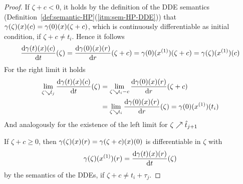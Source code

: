 \begin{proof}
        If $\zeta+c<0$, it holds by the definition of the DDE semantics (Definition~\ref{def:semantic-HP}(\ref{itm:sem-HP-DDE})) that $\gamma(\zeta)(x)(c)=\gamma(0)(x)(\zeta+c)$, which is continuously differentiable as initial condition, if $\zeta+c\neq t_i$. Hence it follows
        \begin{equation*}
            \DD{\trajectory(t)(x)(c)}{t}(\zeta)=\DD{\trajectory(0)(x)(\past)}{\past}(\zeta+c)=\trajectory(0)(\D{x})(\zeta+c)=\trajectory(\zeta)(\D{x})(c)
        \end{equation*}
        For the right limit it holds
        \begin{align*}
            \lim_{\zeta\downto\hat{t}_j} \DD{\trajectory(t)(x)(c)}{t}(\zeta)
                & = \lim_{\zeta\downto t_i-c} \DD{\trajectory(0)(x)(\past)}{\past}(\zeta+c)\\
                & = \lim_{\zeta\downto t_i} \DD{\trajectory(0)(x)(\past)}{\past}(\zeta)
                = \trajectory(0)(\D{x})(t_i)
        \end{align*}
        And analogously for the existence of the left limit for $\zeta\nearrow\hat{t}_{j+1}$

        If $\zeta+c\geq 0$, then $\gamma(\zeta)(x)(r)=\gamma(\zeta+c)(x)(0)$ is differentiable in $\zeta$ with
        \begin{equation*}
            \trajectory(\zeta)(\D{x})(\past) = \DD{\trajectory(t)(x)(\past)}{t}(\zeta)
        \end{equation*}
        by the semantics of the DDEs, if $\zeta+c\neq t_i+\tau_j$.




\end{proof}
